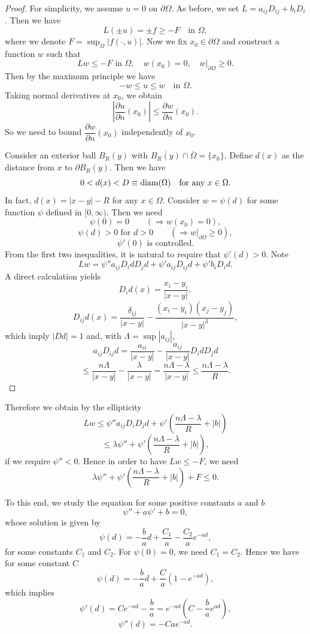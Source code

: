 \begin{proof}
\sketch
For simplicity, we assume $u = 0$ on $\partial\Omega$. As before, we set $L = a_{ij}D_{ij} + b_iD_i$. Then we have
\[
L(\pm u) = \pm f \geq -F \quad \text{in } \Omega,
\]
where we denote $F = \sup_{\Omega}|f(\cdot,u)|$. Now we fix $x_0 \in \partial\Omega$ and construct a function $w$ such that
\[
Lw \leq -F \text{ in } \Omega,\quad w(x_0)=0,\quad w|_{\partial\Omega}\geq 0.
\]
Then by the maximum principle we have
\[
-w \leq u \leq w \quad \text{in } \Omega.
\]
Taking normal derivatives at $x_0$, we obtain
\[
\left|\frac{\partial u}{\partial n}(x_0)\right| \leq \frac{\partial w}{\partial n}(x_0).
\]
So we need to bound $\dfrac{\partial w}{\partial n}(x_0)$ independently of $x_0$.

Consider an exterior ball $B_R(y)$ with $\overline{B_R(y)} \cap \overline{\Omega} = \{x_0\}$. Define $d(x)$ as the distance from $x$ to $\partial B_R(y)$. Then we have
\[
0 < d(x) < D \equiv \operatorname{diam}(\Omega) \quad \text{for any $x \in \Omega$.}
\]
In fact, $d(x)=|x-y|-R$ for any $x \in \Omega$. Consider $w=\psi(d)$ for some function $\psi$ defined in $[0,\infty)$. Then we need
\[
\psi(0)=0 \qquad (\Rightarrow w(x_0)=0),
\]
\[
\psi(d)>0 \text{ for } d>0 \qquad (\Rightarrow w|_{\partial\Omega}\geq 0),
\]
\[
\psi'(0) \text{ is controlled.}
\]
From the first two inequalities, it is natural to require that $\psi'(d)>0$. Note
\[
Lw = \psi''a_{ij}D_i d D_j d + \psi'a_{ij}D_{ij}d + \psi'b_iD_i d.
\]
A direct calculation yields
\[
D_i d(x)=\frac{x_i-y_i}{|x-y|},
\]
\[
D_{ij}d(x)=\frac{\delta_{ij}}{|x-y|}-\frac{(x_i-y_i)(x_j-y_j)}{|x-y|^3},
\]
which imply $|Dd|=1$ and, with $\Lambda=\sup|a_{ij}|$,
\[
a_{ij}D_{ij}d=\frac{a_{ii}}{|x-y|}-\frac{a_{ij}}{|x-y|}D_i d D_j d
\]
\[
\leq \frac{n\Lambda}{|x-y|}-\frac{\lambda}{|x-y|}=\frac{n\Lambda-\lambda}{|x-y|}\leq \frac{n\Lambda-\lambda}{R}.
\]
\end{proof}

Therefore we obtain by the ellipticity
\[
Lw \leq \psi'' a_{ij}D_iD_jd + \psi'\left(\frac{n\Lambda - \lambda}{R} + \lvert b\rvert\right)
\]
\[
\leq \lambda\psi'' + \psi'\left(\frac{n\Lambda - \lambda}{R} + \lvert b\rvert\right),
\]
if we require \(\psi'' < 0\). Hence in order to have \(Lw \leq -F\), we need
\[
\lambda\psi'' + \psi'\left(\frac{n\Lambda - \lambda}{R} + \lvert b\rvert\right) + F \leq 0.
\]

To this end, we study the equation for some positive constants \(a\) and \(b\)
\[
\psi'' + a\psi' + b = 0,
\]
whose solution is given by
\[
\psi(d) = -\frac{b}{a}d + \frac{C_1}{a} - \frac{C_2}{a}e^{-ad},
\]
for some constants \(C_1\) and \(C_2\). For \(\psi(0) = 0\), we need \(C_1 = C_2\). Hence we have for
some constant \(C\)
\[
\psi(d) = -\frac{b}{a}d + \frac{C}{a}(1 - e^{-ad}),
\]
which implies
\[
\psi'(d) = Ce^{-ad} - \frac{b}{a} = e^{-ad}\left(C - \frac{b}{a}e^{ad}\right),
\]
\[
\psi''(d) = -Cae^{-ad}.
\]

